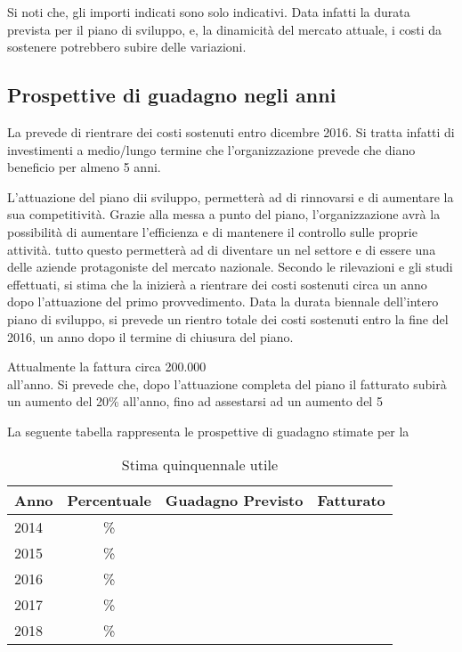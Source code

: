 Si noti che, gli importi indicati sono solo indicativi. Data infatti la durata prevista per il piano di sviluppo, e, la dinamicità del mercato attuale, i costi da sostenere potrebbero subire delle variazioni. 






\subsection{ Prospettive di guadagno negli anni}

La \customer prevede di rientrare dei costi sostenuti entro dicembre 2016. Si tratta infatti di investimenti a medio/lungo termine che l'organizzazione prevede che diano beneficio per almeno 5 anni.

L'attuazione del piano dii sviluppo, permetterà ad  \customer di rinnovarsi e di aumentare la sua competitività. Grazie alla messa a punto del piano, l'organizzazione avrà la possibilità di aumentare l'efficienza e di mantenere il controllo sulle proprie attività. tutto questo permetterà ad \customer di diventare un  nel settore e di essere una delle aziende protagoniste del mercato nazionale. 
Secondo le rilevazioni e gli studi effettuati, si stima che la \customer inizierà a rientrare dei costi sostenuti circa un anno dopo l'attuazione del primo provvedimento. Data la durata biennale dell'intero piano di sviluppo, si prevede un rientro totale dei costi sostenuti entro la fine del 2016, un anno dopo il termine di chiusura del piano.

Attualmente la \customer fattura circa 200.000 \text{\euro} \\ all'anno. Si prevede che, dopo l'attuazione completa del piano il fatturato subirà un aumento del 20\% all'anno, fino ad assestarsi ad un aumento del 5%
 
La seguente tabella rappresenta le prospettive di guadagno stimate per la \customer

\begin{table}[H]
\centering
\begin{tabular}{|p{}|c|c|c|}
\hline 

\textbf{ Anno} &  \textbf{Percentuale} &\textbf{Guadagno Previsto}& \textbf{Fatturato}\\
\hline
 2014 & \% & \text{\euro} & \text{\euro} \\
 2015 & \% & \text{\euro} &\text{\euro} \\
 2016 & \% & \text{\euro} & \text{\euro} \\
 2017 & \% & \text{\euro} & \text{\euro}\\
 2018 & \% & \text{\euro} & \text{\euro} \\

\hline

\end{tabular}
\caption{Stima quinquennale utile }\label{tab:utile}
\end{table}


